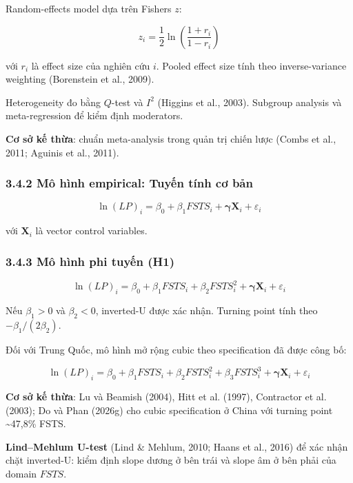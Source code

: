 \documentclass[12pt,a4paper]{article}
\begin{document}
Random-effects model dựa trên Fisher\textquotesingle s \(z\):

\[z_i = \frac{1}{2} \ln\left(\frac{1+r_i}{1-r_i}\right)\]

với \(r_i\) là effect size của nghiên cứu \(i\). Pooled effect size tính
theo inverse-variance weighting (Borenstein et al., 2009).

Heterogeneity đo bằng \(Q\)-test và \(I^2\) (Higgins et al., 2003).
Subgroup analysis và meta-regression để kiểm định moderators.

\textbf{Cơ sở kế thừa}: chuẩn meta-analysis trong quản trị chiến lược
(Combs et al., 2011; Aguinis et al., 2011).

\hypertarget{342-muxf4-huxecnh-empirical-tuyux1ebfn-tuxednh-cux1a1-bux1ea3n}{%
\subsubsection{3.4.2 Mô hình empirical: Tuyến tính cơ
bản}\label{342-muxf4-huxecnh-empirical-tuyux1ebfn-tuxednh-cux1a1-bux1ea3n}}

\[\ln(LP)_i = \beta_0 + \beta_1 FSTS_i + \boldsymbol{\gamma} \mathbf{X}_i + \varepsilon_i\]

với \(\mathbf{X}_i\) là vector control variables.

\hypertarget{343-muxf4-huxecnh-phi-tuyux1ebfn-h1}{%
\subsubsection{3.4.3 Mô hình phi tuyến
(H1)}\label{343-muxf4-huxecnh-phi-tuyux1ebfn-h1}}

\[\ln(LP)_i = \beta_0 + \beta_1 FSTS_i + \beta_2 FSTS_i^2 + \boldsymbol{\gamma} \mathbf{X}_i + \varepsilon_i\]

Nếu \(\beta_1 > 0\) và \(\beta_2 < 0\), inverted-U được xác nhận.
Turning point tính theo \(-\beta_1 / (2\beta_2)\).

Đối với Trung Quốc, mô hình mở rộng cubic theo specification đã được
công bố:

\[\ln(LP)_i = \beta_0 + \beta_1 FSTS_i + \beta_2 FSTS_i^2 + \beta_3 FSTS_i^3 + \boldsymbol{\gamma} \mathbf{X}_i + \varepsilon_i\]

\textbf{Cơ sở kế thừa}: Lu và Beamish (2004), Hitt et al. (1997),
Contractor et al. (2003); Do và Phan (2026g) cho cubic specification ở
China với turning point \textasciitilde47,8\% FSTS.

\textbf{Lind--Mehlum U-test} (Lind \& Mehlum, 2010; Haans et al., 2016)
để xác nhận chặt inverted-U: kiểm định slope dương ở bên trái và slope
âm ở bên phải của domain \(FSTS\).
\end{document}
